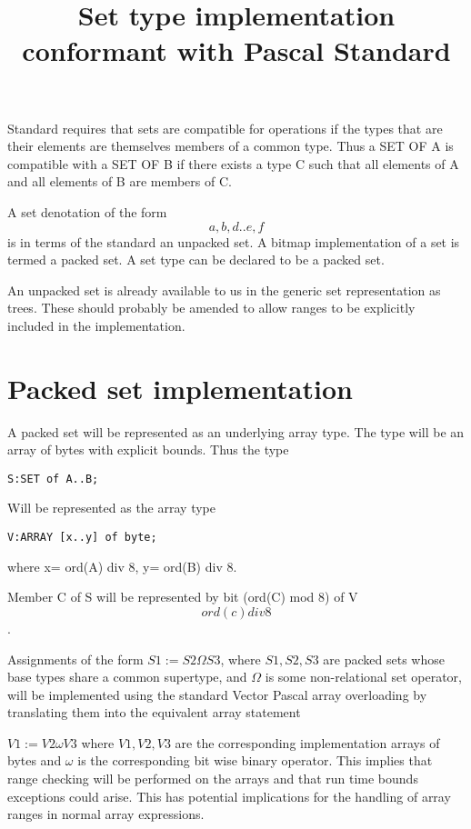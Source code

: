 \title{Set type implementation conformant with Pascal Standard}


Standard requires that sets are compatible for operations if the types
that are their elements are themselves members of a common type.
Thus a SET OF A is compatible with a SET OF B if there exists a
type C such that all elements of A and all elements of B are members
of C.

A set denotation of the form \[a,b, d..e, f\] is in terms of the standard
an unpacked set. A bitmap implementation of a set is termed a packed
set. A set type can be declared to be a packed set.

An unpacked set is already available to us in the generic set representation
as trees. These should probably be amended to allow ranges to be explicitly included
in the implementation.

\section{Packed set implementation}
A packed set will be represented as an underlying array type. The type
will be an array of bytes with explicit bounds.
Thus the type
\begin{verbatim}
S:SET of A..B;

\end{verbatim}
Will be represented as the array type
\begin{verbatim}
V:ARRAY [x..y] of byte;
\end{verbatim}
where x= ord(A) div 8, y= ord(B) div 8.

Member C of S will be represented by bit (ord(C) mod 8) of V\[ord(c) div 8\].

Assignments of the form
$S1:= S2 \Omega S3$, where $S1, S2, S3$ are packed sets whose base types share a common supertype,
and $\Omega$ is some non-relational set operator,
will be implemented using the standard Vector Pascal array overloading by
translating them into the equivalent array statement

$V1:= V2 \omega V3$ where $V1,V2,V3$ are the corresponding implementation arrays
of bytes and $\omega$ is the corresponding bit wise binary operator.
This implies that range checking will be performed on the arrays and that
run time bounds exceptions could arise. This has potential implications for
the handling of array ranges in normal array expressions.

